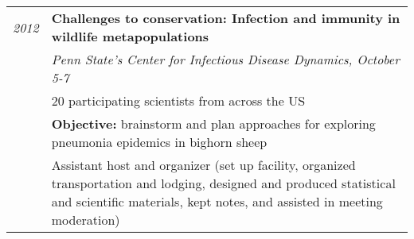 \documentclass[9pt]{article}
\newenvironment{outerlist}[1][\enskip\textbullet]%
        {\begin{itemize}[#1]}{\end{itemize}%
         }
\newenvironment{innerlist}[1][\enskip\textbullet]%
        {\begin{compactitem}[#1]}{\end{compactitem}}
\begin{document}
\begin{tabular}{p{.5cm} p{15cm}}
\hspace{-1.75cm} \footnotesize{\textit{2012}} & \hspace{-.5cm}\textbf{Challenges to conservation: Infection and immunity in wildlife metapopulations}\\
& \textit{Penn State's Center for Infectious Disease Dynamics, October 5-7} \\
& \hspace{.5cm}20 participating scientists from across the US\\
& \hspace{.5cm}\textbf{Objective:} brainstorm and plan approaches for exploring pneumonia epidemics in bighorn sheep\\
& Assistant host and organizer (set up facility, organized transportation and lodging, designed and produced statistical and scientific materials, kept notes, and assisted in meeting moderation)\\

\end{tabular}
\vspace{.15in}
\end{document}
